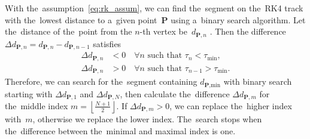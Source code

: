 		With the~assumption~\ref{eq:rk_assum}, we can find the~segment on the~\ac{RK4} track with the~lowest distance to a~given point~$\mathbf{P}$ using a~binary search algorithm. Let the~distance of the~point from the $n$\nobreakdash-th vertex %
		be~$d_{\mathbf{P},n}$%
		. Then the difference $\Delta d_{\mathbf{P},n} = d_{\mathbf{P},n}-d_{\mathbf{P},n-1}$ satisfies
			\begin{equation}
				\begin{aligned}
					\Delta d_{\mathbf{P},n} &< 0\quad \forall n \text{ such that } \tau_n < \tau_\text{min},\\
					\Delta d_{\mathbf{P},n} &> 0\quad \forall n \text{ such that } \tau_{n-1} > \tau_\text{min}.
				\end{aligned}
			\end{equation}
		Therefore, we can search for the~segment containing $d_{\textbf{P},\text{min}}$ with binary search starting with $\Delta d_{\mathbf{P},1}$ and $\Delta d_{\mathbf{P},N}$, then calculate the~difference $\Delta d_{\mathbf{P},m}$ for the~middle index $m = \left\lfloor\frac{N+1}{2}\right\rfloor$. If $\Delta d_{\mathbf{P},m} > 0$, we can replace the~higher index with~$m$, otherwise we replace the lower index. The~search stops when the~difference between the~minimal and maximal index is one.
		
